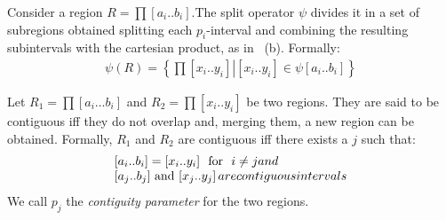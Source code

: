 \begin{definition}
\label{pers02.def:Splitting-a-region}
Consider a region $R=\prod\left[a_{i}..b_{i}\right]$.The split operator $\psi$ divides it in a set of subregions obtained splitting each $p_i$-interval and combining the resulting subintervals with the cartesian product, as in ~(b). Formally:
	\begin{align}
		\psi(R) = \left\{ \left.\prod\left[x_{i}..y_{i}\right]\right|\left[x_{i}..y_{i}\right]\in \psi\left[a_{i}..b_{i}\right]  \right\} 
	\end{align}

\end{definition}


	\begin{figure}[t]
		\begin{center}
		\end{center}
	\end{figure}



\begin{definition}Let $R_{1}=\prod\left[a_{i}\dots b_{i}\right]$ and $R_{2}=\prod\left[x_{i}..y_{i}\right]$
be two regions. They are said to be contiguous iff they do not overlap and, merging them, a new region can be obtained. Formally, $R_1$ and $R_2$ are contiguous iff there exists a $j$ such that:
	\begin{align}\begin{array}{l}
		\left[a_{i}..b_{i}\right]=\left[x_{i}..y_{i}\right]$
	\mbox{ for } $i\neq j \mbox{      and} \\
		\left[a_{j}..b_{j}\right]$ and $\left[x_{j}..y_{j}\right] \mbox{ are contiguous intervals}
	\end{array}\end{align}
\noindent We call $p_j$ the \emph{contiguity parameter} for the two regions.
\end{definition}

